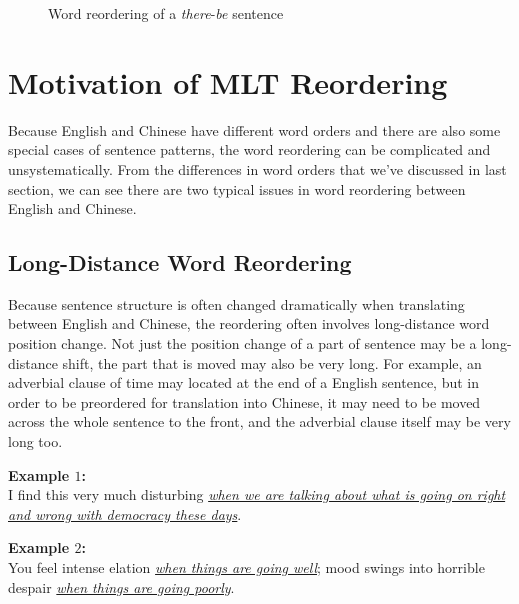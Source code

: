 \begin{figure}[H]
\centering

\caption{Word reordering of a \emph{there}-\emph{be} sentence}
\end{figure}

\section{Motivation of MLT Reordering}
\label{ch:ReorderingApproach:sec:Motivation}

Because English and Chinese have different word orders and there are also some special cases of sentence patterns, the word reordering can be complicated and unsystematically. From the differences in word orders that we've discussed in last section, we can see there are two typical issues in word reordering between English and Chinese.

\subsection{Long-Distance Word Reordering}

Because sentence structure is often changed dramatically when translating between English and Chinese, the reordering often involves long-distance word position change. Not just the position change of a part of sentence may be a long-distance shift, the part that is moved may also be very long. For example, an adverbial clause of time may located at the end of a English sentence, but in order to be preordered for translation into Chinese, it may need to be moved across the whole sentence to the front, and the adverbial clause itself may be very long too. 

\textbf{Example $1$:}\\
I find this very much disturbing \emph{\ul{when we are talking about what is going on right and wrong with democracy these days}}.\smallskip\\

\textbf{Example $2$:}\\
You feel intense elation \emph{\ul{when things are going well}}; mood swings into horrible despair \emph{\ul{when things are going poorly}}.\smallskip\\

